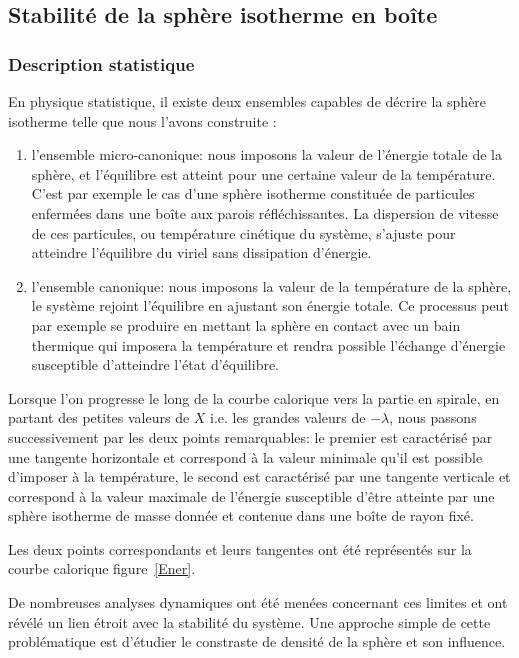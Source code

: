 \subsection{Stabilité de la sphère isotherme en boîte}
\subsubsection{Description statistique}
	En physique statistique, il existe deux ensembles capables de décrire la sphère isotherme telle que nous l'avons construite :
	\begin{enumerate}

		\item l'ensemble micro-canonique: nous imposons la valeur de l'énergie totale de la sphère, et
			l'équilibre est atteint pour une certaine valeur de la température. C'est par exemple le cas
			d'une sphère isotherme constituée de particules enfermées dans une boîte aux parois
			réfléchissantes. La dispersion de vitesse de ces particules, ou température cinétique du
			système, s'ajuste pour atteindre l'équilibre du viriel sans dissipation d'énergie.
		
		\item l'ensemble canonique: nous imposons la valeur de la température de la sphère, le système rejoint
			l'équilibre en ajustant son énergie totale. Ce processus peut par exemple se produire en mettant
			la sphère en contact avec un bain thermique qui imposera la température et rendra possible
			l'échange d'énergie susceptible d'atteindre l'état d'équilibre.
		
	\end{enumerate}

	Lorsque l'on progresse le long de la courbe calorique vers la partie en spirale, en partant des petites valeurs
	de $X$ i.e. les grandes valeurs de $-\lambda$, nous passons successivement par les deux points remarquables: le
	premier est caractérisé par une tangente horizontale et correspond à la valeur minimale qu'il est possible d'imposer à
	la température, le second est caractérisé par une tangente verticale et correspond à la valeur maximale de
	l'énergie susceptible d'être atteinte par une sphère isotherme de masse donnée et contenue dans une boîte de
	rayon fixé.
	
	Les deux points correspondants et leurs tangentes ont été représentés sur la courbe calorique figure~\ref{Ener}.
	
	De nombreuses analyses dynamiques ont été menées concernant ces limites et ont révélé un lien étroit avec la stabilité du système. Une
	approche simple de cette problématique est d'étudier le constraste de densité de la sphère et son influence.
	
